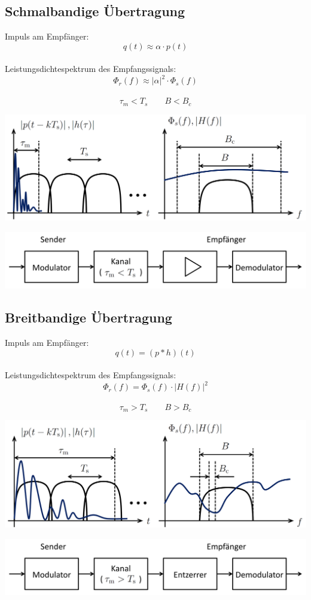 \subsection{Schmalbandige Übertragung}
Impuls am Empfänger:
\[ q(t) \approx \alpha \cdot p(t) \]
~\\
Leistungsdichtespektrum des Empfangssignals:
\[ \Phi_r(f) \approx |\alpha|^2 \cdot \Phi_s(f) \]
~\\
\[ \tau_m < T_s \qquad B < B_c \]
\begin{center}
	\includegraphics[width=.9\textwidth]{./images/schmalband.png}
\end{center}
\begin{center}
	\includegraphics[width=.9\textwidth]{./images/mod_schmalband.png}
\end{center}

\subsection{Breitbandige Übertragung}
Impuls am Empfänger:
\[ q(t) = (p*h)(t) \]
~\\
Leistungsdichtespektrum des Empfangssignals:
\[ \Phi_r(f) = \Phi_s(f) \cdot |H(f)|^2 \]
~\\
\[ \tau_m > T_s \qquad B > B_c \]
\begin{center}
	\includegraphics[width=.9\textwidth]{./images/breitband.png}
\end{center}
\begin{center}
	\includegraphics[width=.9\textwidth]{./images/mod_breitband.png}
\end{center}

